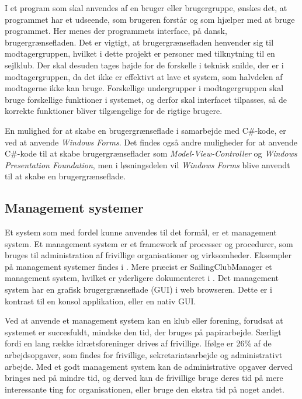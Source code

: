 I et program som skal anvendes af en bruger eller brugergruppe, ønskes det, at programmet har et udseende, som
brugeren forstår og som hjælper med at bruge programmet. Her menes der programmets interface, på dansk,
brugergrænsefladen. Det er vigtigt, at brugergrænsefladen henvender sig til modtagergruppen, hvilket i dette
projekt er personer med tilknytning til en sejlklub. Der skal desuden tages højde for de forskelle i teknisk
snilde, der er i modtagergruppen, da det ikke er effektivt at lave et system, som halvdelen af modtagerne ikke
kan bruge. Forskellige undergrupper i modtagergruppen skal bruge forskellige funktioner i systemet, og derfor
skal interfacet tilpasses, så de korrekte funktioner bliver tilgængelige for de rigtige brugere.

En mulighed for at skabe en brugergrænseflade i samarbejde med C\#-kode, er ved at anvende \textit{Windows
Forms}. Det findes også andre muligheder for at anvende C\#-kode til at skabe brugergrænseflader som
\textit{Model-View-Controller} og \textit{Windows Presentation Foundation}, men i løsningsdelen vil
\textit{Windows Forms} blive anvendt til at skabe en brugergrænseflade.

\subsection{Management systemer}\label{subsec:management-systemer}

Et system som med fordel kunne anvendes til det formål, er et management system. Et management system er et
framework af processer og procedurer, som bruges til administration af frivillige organisationer og
virksomheder. Eksempler på management systemer findes i . Mere præcist er
SailingClubManager et management system, hvilket er yderligere dokumenteret i . Det
management system har en grafisk brugergrænseflade (GUI) i web browseren. Dette er i kontrast til en konsol
applikation, eller en nativ GUI.

Ved at anvende et management system kan en klub eller forening, forudsat at systemet er succesfuldt, mindske den
tid, der bruges på papirarbejde. Særligt fordi en lang række idrætsforeninger drives af frivillige. Ifølge
\citet{Frivilligrapporten} er 26\% af de arbejdsopgaver, som findes for frivillige, sekretariatsarbejde og
administrativt arbejde. Med et godt management system kan de administrative opgaver derved bringes ned på
mindre tid, og derved kan de frivillige bruge deres tid på mere interessante ting for organisationen, eller
bruge den ekstra tid på noget andet.


